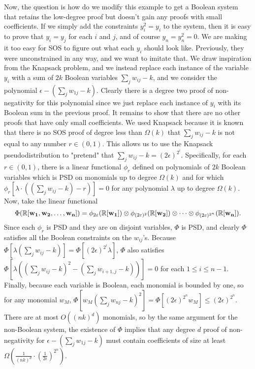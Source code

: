 Now, the question is how do we modify this example to get a Boolean system that retains the low-degree proof but doesn't gain any proofs with small coefficients. If we simply add the constraints $y_i^2 = y_i$ to the system, then it is easy to prove that $y_i = y_j$ for each $i$ and $j$, and of course $y_n = y_n^2 = 0$. We are making it too easy for SOS to figure out what each $y_i$ should look like. Previously, they were unconstrained in any way, and we want to imitate that. We draw inspiration from the Knapsack problem, and we instead replace each instance of the variable $y_i$ with a sum of $2k$ Boolean variables $\sum_j w_{ij} - k$, and we consider the polynomial $\epsilon - (\sum_j w_{1j} - k)$. Clearly there is a degree two proof of non-negativity for this polynomial since we just replace each instance of $y_i$ with its Boolean sum in the previous proof. It remains to show that there are no other proofs that have only small coefficients. We used Knapsack because it is known that there is no SOS proof of degree less than $\Omega(k)$ that $\sum_j w_{ij} - k$ is not equal to any number $r \in (0,1)$. This allows us to use the Knapsack pseudodistribution to "pretend" that $\sum_j w_{ij} - k = (2\epsilon)^{2^i}$. Specifically, for each $r \in (0,1)$, there is a linear functional $\phi_r$ defined on polynomials of $2k$ Boolean variables which is PSD on monomials up to degree $\Omega(k)$ and for which $\phi_r[\lambda\cdot((\sum_j w_{ij} - k) - r)] = 0$ for any polynomial $\lambda$ up to degree $\Omega(k)$. Now, take the linear functional 
\[\Phi(\mathbb R[{\bf w_1}, {\bf w_2}, \dots, {\bf w_n}]) = \phi_{2\varepsilon}(\mathbb R[{\bf w_1}]) \otimes \phi_{(2\varepsilon)^2}(\mathbb R[{\bf w_2}])\otimes \dots \otimes \phi_{(2\varepsilon)^{2^n}}(\mathbb R[{\bf w_n}]).\]
Since each $\phi_r$ is PSD and they are on disjoint variables, $\Phi$ is PSD, and clearly $\Phi$ satisfies all the Boolean constraints on the $w_{ij}$'s. Because $\Phi[\lambda(\sum_j w_{ij} - k)] = \Phi[(2\epsilon)^{2^i}\lambda]$, $\Phi$ also satisfies $\Phi[\lambda((\sum_j w_{ij}-k)^2 - (\sum_j w_{i+1,j} - k))] = 0$ for each $1 \leq i \leq n-1$. Finally, because each variable is Boolean, each monomial is bounded by one, so for any monomial $w_M$, $\Phi[w_M(\sum_j w_{nj} - k)^2] = \Phi[(2\epsilon)^{2^n} w_M] \leq (2\epsilon)^{2^n}$. There are at most $O((nk)^d)$ monomials, so by the same argument for the non-Boolean system, the existence of $\Phi$ implies that any degree $d$ proof of non-negativity for $\epsilon - (\sum_j w_{1j} - k)$ must contain coefficients of size at least $\Omega(\frac{1}{(nk)^d} \cdot \left(\frac{1}{2\epsilon}\right)^{2^n})$.

